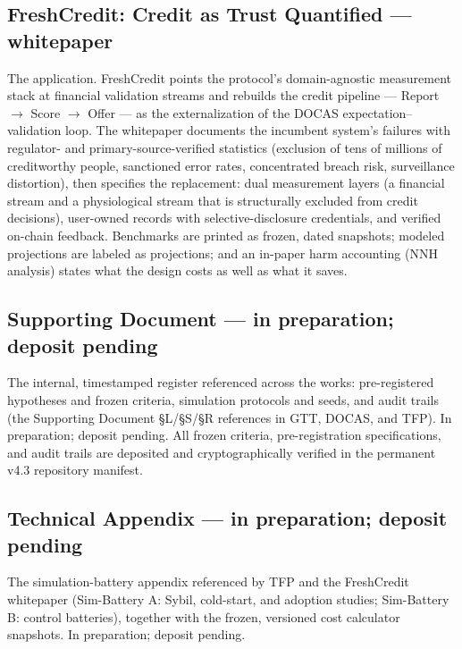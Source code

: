 \documentclass[
]{article}
\begin{document}
\subsection{FreshCredit: Credit as Trust Quantified ---
whitepaper}\label{freshcredit-credit-as-trust-quantified-whitepaper}

The application. FreshCredit points the protocol's domain-agnostic
measurement stack at financial validation streams and rebuilds the
credit pipeline --- Report \(\to\) Score \(\to\) Offer --- as the
externalization of the DOCAS expectation--validation loop. The
whitepaper documents the incumbent system's failures with regulator- and
primary-source-verified statistics (exclusion of tens of millions of
creditworthy people, sanctioned error rates, concentrated breach risk,
surveillance distortion), then specifies the replacement: dual
measurement layers (a financial stream and a physiological stream that
is structurally excluded from credit decisions), user-owned records with
selective-disclosure credentials, and verified on-chain feedback.
Benchmarks are printed as frozen, dated snapshots; modeled projections
are labeled as projections; and an in-paper harm accounting (NNH
analysis) states what the design costs as well as what it saves.

\subsection{Supporting Document --- in preparation; deposit
pending}\label{supporting-document-in-preparation-deposit-pending}

The internal, timestamped register referenced across the works:
pre-registered hypotheses and frozen criteria, simulation protocols and
seeds, and audit trails (the Supporting Document §L/§S/§R references in
GTT, DOCAS, and TFP). In preparation; deposit pending. All frozen
criteria, pre-registration specifications, and audit trails are
deposited and cryptographically verified in the permanent v4.3
repository manifest.

\subsection{Technical Appendix --- in preparation; deposit
pending}\label{technical-appendix-in-preparation-deposit-pending}

The simulation-battery appendix referenced by TFP and the FreshCredit
whitepaper (Sim-Battery A: Sybil, cold-start, and adoption studies;
Sim-Battery B: control batteries), together with the frozen, versioned
cost calculator snapshots. In preparation; deposit pending.
\end{document}

